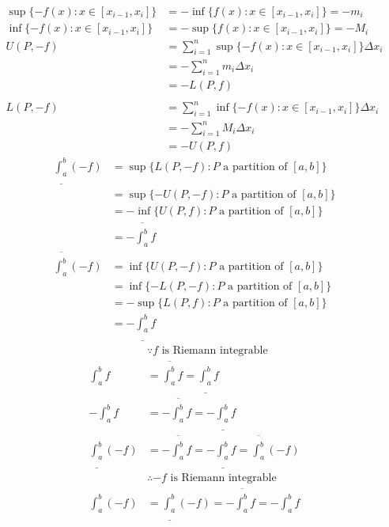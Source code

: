 \documentclass[12pt, border = 4pt, multi]{article} %
\begin{document}
\begin{align*}
\sup\{-f(x): x \in [x_{i - 1}, x_i]\} &= -\inf\{f(x): x \in [x_{i - 1}, x_i]\} = -m_i\\
\inf\{-f(x): x \in [x_{i - 1}, x_i]\} &= -\sup\{f(x): x \in [x_{i - 1}, x_i]\} = -M_i\\
U(P, -f) &= \sum_{i = 1} ^ n \sup\{-f(x): x \in [x_{i - 1}, x_i]\}\Delta x_i\\
&= -\sum_{i = 1} ^ n m_i \Delta x_i\\
&= -L(P, f)\\
\\
L(P, -f) &= \sum_{i = 1} ^ n \inf\{-f(x): x \in [x_{i - 1}, x_i]\}\Delta x_i\\
&= -\sum_{i = 1} ^ n M_i \Delta x_i\\
&= -U(P, f)
\end{align*}
\begin{align*}
\underline{\int_a ^ b} (-f) &= \sup\{L(P, -f): P \text{ a partition of }[a, b]\}\\
&= \sup\{-U(P, -f): P \text{ a partition of }[a, b]\}\\
&= -\inf\{U(P, f): P \text{ a partition of }[a, b]\}\\
&= -\overline{\int_a ^ b} f\\
\overline{\int_a ^ b} (-f) &= \inf\{U(P, -f): P \text{ a partition of }[a, b]\}\\
&= \inf\{-L(P, -f): P \text{ a partition of }[a, b]\}\\
&= -\sup\{L(P, f): P \text{ a partition of }[a, b]\}\\
&= -\underline{\int_a ^ b} f
\end{align*}
\begin{align*}
&\because f \text{ is Riemann integrable}\\
\int_a ^ b f &= \overline{\int_a ^ b} f = \underline{\int_a ^ b} f\\
-\int_a ^ b f &= -\overline{\int_a ^ b} f = -\underline{\int_a ^ b} f\\
\underline{\int_a ^ b} (-f) &= -\overline{\int_a ^ b} f = -\underline{\int_a ^ b} f = \overline{\int_a ^ b} (-f)\\
&\therefore -f \text{ is Riemann integrable}\\
\int_a ^ b (-f) &= \underline{\int_a ^ b} (-f) = -\overline{\int_a ^ b} f = -\int_a ^ b f\\
\end{align*}
\\
\\
\\
\end{document}
